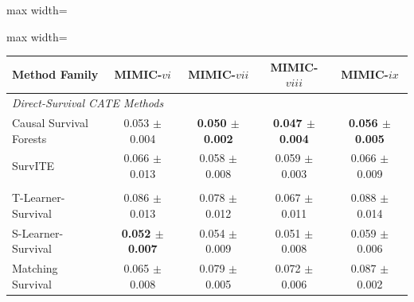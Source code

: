 \begin{table}[htbp]
{        \par\noindent\begin{adjustbox}{max width=\linewidth}\begin{minipage}[c]{\linewidth}
        \centering
        \begin{adjustbox}{max width=\linewidth}\begin{tabular}{lcccc}
        \toprule
        \textbf{Method Family} & \textbf{MIMIC-$vi$} & \textbf{MIMIC-$vii$} & \textbf{MIMIC-$viii$} & \textbf{MIMIC-$ix$} \\
        \midrule
        \multicolumn{5}{l}{\textit{Direct-Survival CATE Methods}} \\
                Causal Survival Forests & 0.053 $\pm$ 0.004 & \textbf{0.050 $\pm$ 0.002} & \textbf{0.047 $\pm$ 0.004} & \textbf{0.056 $\pm$ 0.005} \\ 
                SurvITE & 0.066 $\pm$ 0.013 & 0.058 $\pm$ 0.008 & 0.059 $\pm$ 0.003 & 0.066 $\pm$ 0.009 \\ 
        \addlinespace
        \multicolumn{5}{l}{\textit{Survival Meta-Learners}} \\
                T-Learner-Survival & 0.086 $\pm$ 0.013 & 0.078 $\pm$ 0.012 & 0.067 $\pm$ 0.011 & 0.088 $\pm$ 0.014 \\ 
                S-Learner-Survival & \textbf{0.052 $\pm$ 0.007} & 0.054 $\pm$ 0.009 & 0.051 $\pm$ 0.008 & 0.059 $\pm$ 0.006 \\ 
                Matching Survival & 0.065 $\pm$ 0.008 & 0.079 $\pm$ 0.005 & 0.072 $\pm$ 0.006 & 0.087 $\pm$ 0.002 \\ 
        \bottomrule
        \end{tabular}\end{adjustbox}
        \end{minipage}\end{adjustbox}\par
}
\end{table}
